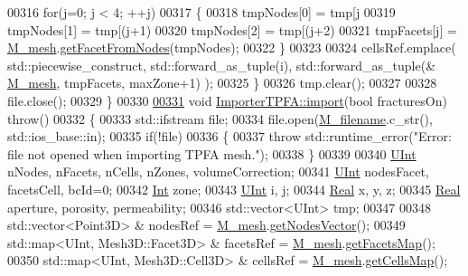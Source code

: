 \begin{DoxyCode}
00316         \textcolor{keywordflow}{for}(j=0; j < 4; ++j)
00317         \{
00318             tmpNodes[0] = tmp[j %
00319             tmpNodes[1] = tmp[(j+1) %
00320             tmpNodes[2] = tmp[(j+2) %
00321             tmpFacets[j] = \hyperlink{classFVCode3D_1_1Importer_a6f1542d6c6ac192e36c8eec7dc366653}{M\_mesh}.\hyperlink{classFVCode3D_1_1Mesh3D_a2ac0b84c13a15ed42cdd8c98066eae98}{getFacetFromNodes}(tmpNodes);
00322         \}
00323 
00324         cellsRef.emplace( std::piecewise\_construct, std::forward\_as\_tuple(i), std::forward\_as\_tuple(&
      \hyperlink{classFVCode3D_1_1Importer_a6f1542d6c6ac192e36c8eec7dc366653}{M\_mesh}, tmpFacets, maxZone+1) );
00325     \}
00326     tmp.clear();
00327 
00328     file.close();
00329 \}
00330 
\hypertarget{Import_8cpp_source.tex_l00331}{}\hyperlink{classFVCode3D_1_1ImporterTPFA_adafe208596baeaca51051ea9692fa757}{00331} \textcolor{keywordtype}{void} \hyperlink{classFVCode3D_1_1ImporterTPFA_adafe208596baeaca51051ea9692fa757}{ImporterTPFA::import}(\textcolor{keywordtype}{bool} fracturesOn) \textcolor{keywordflow}{throw}()
00332 \{
00333     std::ifstream file;
00334     file.open(\hyperlink{classFVCode3D_1_1Importer_a318e689fb93c5c906f85aa13685724d7}{M\_filename}.c\_str(), std::ios\_base::in);
00335     \textcolor{keywordflow}{if}(!file)
00336     \{
00337         \textcolor{keywordflow}{throw} std::runtime\_error(\textcolor{stringliteral}{"Error: file not opened when importing TPFA mesh."});
00338     \}
00339 
00340     \hyperlink{namespaceFVCode3D_a4bf7e328c75d0fd504050d040ebe9eda}{UInt} nNodes, nFacets, nCells, nZones, volumeCorrection;
00341     \hyperlink{namespaceFVCode3D_a4bf7e328c75d0fd504050d040ebe9eda}{UInt} nodesFacet, facetsCell, bcId=0;
00342     \hyperlink{namespaceFVCode3D_a2263c42382b217732a2d4e1f7348120a}{Int} zone;
00343     \hyperlink{namespaceFVCode3D_a4bf7e328c75d0fd504050d040ebe9eda}{UInt} i, j;
00344     \hyperlink{namespaceFVCode3D_a40c1f5588a248569d80aa5f867080e83}{Real} x, y, z;
00345     \hyperlink{namespaceFVCode3D_a40c1f5588a248569d80aa5f867080e83}{Real} aperture, porosity, permeability;
00346     std::vector<UInt> tmp;
00347 
00348     std::vector<Point3D> & nodesRef = \hyperlink{classFVCode3D_1_1Importer_a6f1542d6c6ac192e36c8eec7dc366653}{M\_mesh}.\hyperlink{classFVCode3D_1_1Mesh3D_a04162ec60e0fe52674b3ecbb7de1185c}{getNodesVector}();
00349     std::map<UInt, Mesh3D::Facet3D> & facetsRef = \hyperlink{classFVCode3D_1_1Importer_a6f1542d6c6ac192e36c8eec7dc366653}{M\_mesh}.\hyperlink{classFVCode3D_1_1Mesh3D_a76de387da2a552e3e1210d795bc7acf9}{getFacetsMap}();
00350     std::map<UInt, Mesh3D::Cell3D> & cellsRef = \hyperlink{classFVCode3D_1_1Importer_a6f1542d6c6ac192e36c8eec7dc366653}{M\_mesh}.\hyperlink{classFVCode3D_1_1Mesh3D_ad904ef5e068c89951d77e9364e960bf3}{getCellsMap}();

\end{DoxyCode}
